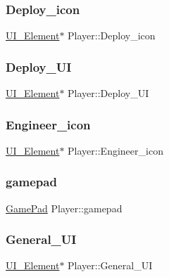 \subsubsection{\texorpdfstring{Deploy\_icon}{Deploy\_icon}}
{\footnotesize\ttfamily \mbox{\hyperlink{class_u_i___element}{U\+I\+\_\+\+Element}}$\ast$ Player\+::\+Deploy\+\_\+icon}

\mbox{\label{class_player_aadaf2cbef1851be0c84e6f34fc4db253}} 
\subsubsection{\texorpdfstring{Deploy\_UI}{Deploy\_UI}}
{\footnotesize\ttfamily \mbox{\hyperlink{class_u_i___element}{U\+I\+\_\+\+Element}}$\ast$ Player\+::\+Deploy\+\_\+\+UI}

\mbox{\label{class_player_a1a558107defcb163a605a69750724820}} 
\subsubsection{\texorpdfstring{Engineer\_icon}{Engineer\_icon}}
{\footnotesize\ttfamily \mbox{\hyperlink{class_u_i___element}{U\+I\+\_\+\+Element}}$\ast$ Player\+::\+Engineer\+\_\+icon}

\mbox{\label{class_player_a07c3f36cd10eb75c18b15aea6c5c4467}} 
\subsubsection{\texorpdfstring{gamepad}{gamepad}}
{\footnotesize\ttfamily \mbox{\hyperlink{struct_game_pad}{Game\+Pad}} Player\+::gamepad}

\mbox{\label{class_player_a5a13c3b62fc6b92b1955579fc507dec6}} 
\subsubsection{\texorpdfstring{General\_UI}{General\_UI}}
{\footnotesize\ttfamily \mbox{\hyperlink{class_u_i___element}{U\+I\+\_\+\+Element}}$\ast$ Player\+::\+General\+\_\+\+UI}

